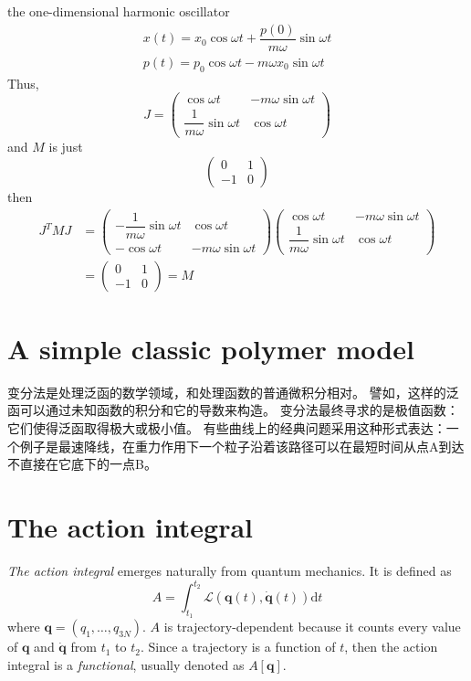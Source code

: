 \documentclass[
  10pt,
  twoside,
  openany,
  b5paper, %
  colorscheme = bootstrap-v4, %
]{qyxf-book}
\numberwithin{equation}{section}
\newcommand{\vq}{\boldsymbol{q}}
\newcommand{\dvq}{\dot{\vq}}
\newcommand{\dt}{\mathrm{d}t}
\newcommand{\lag}{\mathcal{L}} %
\newcommand{\intot}{\int_{t_1}^{t_2}}
\begin{document}
\example the one-dimensional harmonic oscillator
\begin{gather*}
	x(t)=x_0\cos\omega t+\dfrac{p(0)}{m\omega}\sin\omega t\\
	p(t)=p_0\cos\omega t-m\omega x_0\sin\omega t
\end{gather*}
Thus, 
\begin{equation*}
	J=\begin{pmatrix}
		\cos\omega t & -m\omega\sin\omega t \\
		\dfrac{1}{m\omega}\sin\omega t & \cos\omega t
	\end{pmatrix}
\end{equation*}
and $M$ is just
\begin{equation*}
	\begin{pmatrix}
		0 & 1 \\
		-1 & 0
	\end{pmatrix}
\end{equation*}
then
\begin{align*}
	J^TMJ&=
	\begin{pmatrix}
		-\dfrac{1}{m\omega}\sin\omega t & \cos\omega t \\
		-\cos\omega t & -m\omega\sin\omega t
	\end{pmatrix}
	\begin{pmatrix}
		\cos\omega t & -m\omega\sin\omega t \\
		\dfrac{1}{m\omega}\sin\omega t & \cos\omega t
	\end{pmatrix}\\
	&=\begin{pmatrix}
		0 & 1 \\
		-1 & 0
	\end{pmatrix} = M
\end{align*}

\section{A simple classic polymer model}
变分法是处理泛函的数学领域，和处理函数的普通微积分相对。 譬如，这样的泛函可以通过未知函数的积分和它的导数来构造。 变分法最终寻求的是极值函数：它们使得泛函取得极大或极小值。 有些曲线上的经典问题采用这种形式表达：一个例子是最速降线，在重力作用下一个粒子沿着该路径可以在最短时间从点A到达不直接在它底下的一点B。

\section{The action integral}
\textit{The action integral} emerges naturally from quantum mechanics. It is defined as
\begin{equation}
	A=\intot\lag\left(\vq(t),\dvq(t)\right)\dt
\end{equation}
where $\vq=(q_1,\dots,q_{3N})$. $A$ is trajectory-dependent because it counts every value of $\vq$ and $\dvq$ from $t_1$ to $t_2$. Since a trajectory is a function of $t$, then the action integral is a \textit{functional}, usually denoted as $A\left[\vq\right]$.
\end{document}
